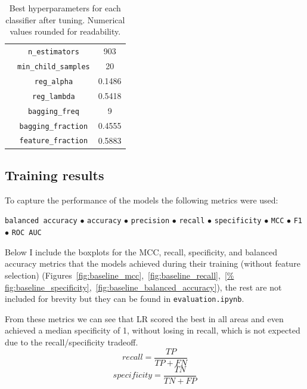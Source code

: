 \documentclass[12pt]{article}
\begin{document}
\begin{table}[H]
\begin{tabular}{|c|c|c|}
      & \texttt{n\_estimators} & 903 \\
      & \texttt{min\_child\_samples} & 20 \\
      & \texttt{reg\_alpha} & 0.1486 \\
      & \texttt{reg\_lambda} & 0.5418 \\
      & \texttt{bagging\_freq} & 9 \\
      & \texttt{bagging\_fraction} & 0.4555 \\
      & \texttt{feature\_fraction} & 0.5883 \\
    \hline
    \end{tabular}
    \caption{Best hyperparameters for each classifier after tuning. Numerical
    values rounded for readability.}
    \label{tab:hyperparams_models}
\end{table}


\subsection{Training results}

To capture the performance of the models the following metrics were used:
\begin{center}
    \texttt{balanced accuracy}
    $\bullet$
    \texttt{accuracy}
    $\bullet$
    \texttt{precision}
    $\bullet$
    \texttt{recall}
    $\bullet$
    \texttt{specificity}
    $\bullet$
    \texttt{MCC}
    $\bullet$
    \texttt{F1}
    $\bullet$
    \texttt{ROC AUC}
\end{center}

Below I include the boxplots for the MCC, recall, specificity, and balanced
accuracy metrics that the models achieved during their training (without
feature selection)
(Figures~\ref{fig:baseline_mcc},~\ref{fig:baseline_recall},~\ref{%
fig:baseline_specificity},~\ref{fig:baseline_balanced_accuracy}), the rest are
not included for brevity but they can be found in \texttt{evaluation.ipynb}.

From these metrics we can see that LR scored the best in all areas and even
achieved a median specificity of 1, without losing in recall, which is not
expected due to the recall/specificity tradeoff.
\[
recall = \frac{TP}{TP + FN}
\]
\[
specificity = \frac{TN}{TN + FP}
\]
\end{document}
